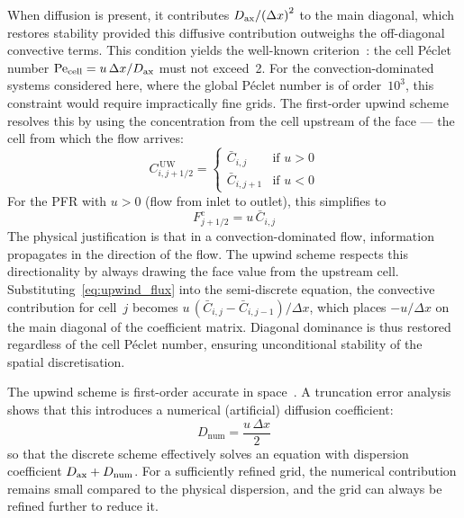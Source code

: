 When diffusion is present, it contributes \(D_{\mathrm{ax}} / {(\Delta x)}^{2}\) to the main diagonal, which restores stability provided this diffusive contribution outweighs the off-diagonal convective terms. This condition yields the well-known criterion~\cite{Versteeg2007}: the cell P\'eclet number \(\mathrm{Pe}_{\mathrm{cell}} = u\,\Delta x / D_{\mathrm{ax}}\) must not exceed~2. For the convection-dominated systems considered here, where the global P\'eclet number is of order~\(10^3\), this constraint would require impractically fine grids. The first-order upwind scheme~\cite{Patankar1980} resolves this by using the concentration from the cell upstream of the face --- the cell from which the flow arrives:
%
\begin{equation}
  C_{i,j+1/2}^{\,\mathrm{UW}} =
  \begin{cases}
    \bar{C}_{i,j}   & \text{if } u > 0 \\[4pt]
    \bar{C}_{i,j+1} & \text{if } u < 0
  \end{cases}
  \label{eq:upwind}
\end{equation}
%
For the PFR with \(u > 0\) (flow from inlet to outlet), this simplifies to
%
\begin{equation}
  F^{\mathrm{c}}_{j+1/2} = u\,\bar{C}_{i,j}
  \label{eq:upwind_flux}
\end{equation}
%
The physical justification is that in a convection-dominated flow, information propagates in the direction of the flow. The upwind scheme respects this directionality by always drawing the face value from the upstream cell. Substituting~\eqref{eq:upwind_flux} into the semi-discrete equation, the convective contribution for cell~\(j\) becomes \(u\,(\bar{C}_{i,j} - \bar{C}_{i,j-1})/\Delta x\), which places \(-u/\Delta x\) on the main diagonal of the coefficient matrix. Diagonal dominance is thus restored regardless of the cell P\'eclet number, ensuring unconditional stability of the spatial discretisation.

The upwind scheme is first-order accurate in space~\cite{Patankar1980}. A truncation error analysis shows that this introduces a numerical (artificial) diffusion coefficient:
%
\begin{equation}
  D_{\mathrm{num}} = \frac{u\,\Delta x}{2}
  \label{eq:numerical_diffusion}
\end{equation}
%
so that the discrete scheme effectively solves an equation with dispersion coefficient \(D_{\mathrm{ax}} + D_{\mathrm{num}}\). For a sufficiently refined grid, the numerical contribution remains small compared to the physical dispersion, and the grid can always be refined further to reduce it. 

